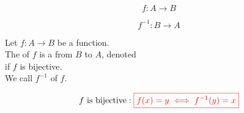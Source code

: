 
\begin{frame}{}
  \begin{center}
  \end{center}

\end{frame}

\begin{frame}{}
  \[
    f: A \to B
  \]

  \vspace{0.60cm}
  \begin{center}
    \[
      f^{-1}: B \to A
    \]
  \end{center}
\end{frame}

\begin{frame}{}
  \begin{definition}
    Let $f: A \to B$ be a function. \\[5pt]

    The  of $f$ is a 
    from $B$ to $A$, denoted  \\[3pt]
    if $f$ is bijective. \\[8pt]

    \pause
    We call $f^{-1}$   of $f$.
  \end{definition}

  \pause
  \vspace{0.50cm}
  \[
    f \text{ is bijective}: \textcolor{red}{\boxed{f(x) = y \iff f^{-1}(y) = x}}
  \]
\end{frame}

